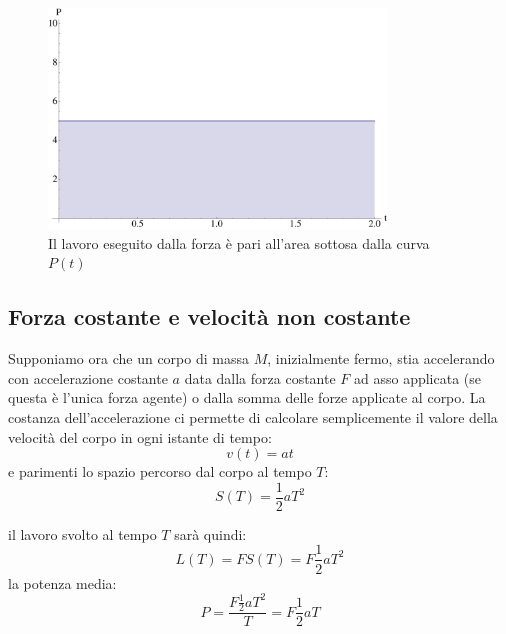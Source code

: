 \documentclass[a4paper,10pt,oneside]{article}
\begin{document}
\begin{figure}[H]
 \centering
 \includegraphics[width=0.8\textwidth]{./immagini/potenza_costante_lavoro.pdf}
 \caption{Il lavoro eseguito dalla forza è pari all'area sottosa dalla curva $P(t)$}
 \label{fig:potenza_lavoro1}
\end{figure}


\subsection*{Forza costante e velocità non costante}

Supponiamo ora che un corpo di massa $M$, inizialmente fermo, stia accelerando con accelerazione costante $a$ data dalla forza costante $F$ ad asso applicata (se questa è l'unica forza agente) o dalla somma delle forze applicate al corpo.
La costanza dell'accelerazione ci permette di calcolare semplicemente  il valore della velocità del corpo in ogni istante di tempo:
\begin{equation}
 v(t)=at
\end{equation}
e parimenti lo spazio percorso dal corpo al tempo $T$:
\begin{equation}
 S(T)=\frac1 2 aT^2
\end{equation}

il lavoro svolto al tempo $T$ sarà quindi:
\begin{equation}
 L(T)=FS(T)=F\frac{1}{2}aT^2
\end{equation}
la potenza media:
\begin{equation}
 P=\frac{F\frac{1}{2}aT^2}{T}=F\frac 1 2 aT
\end{equation}
\end{document}
